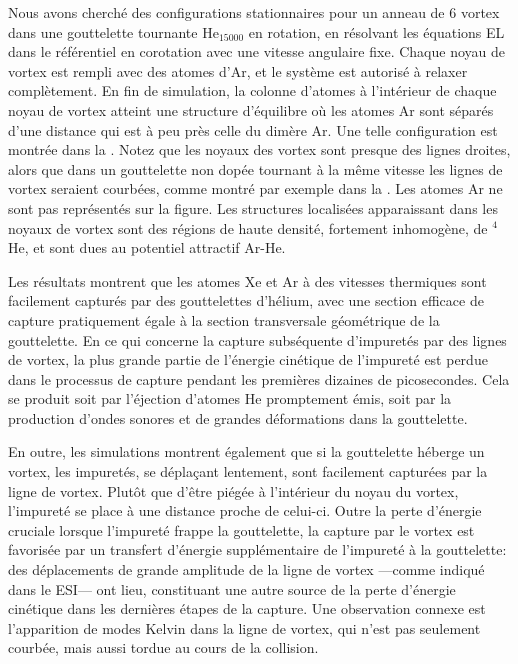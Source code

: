    Nous avons cherché des configurations stationnaires pour un anneau de 6 vortex dans une gouttelette tournante He$_{15000}$ en rotation,  en résolvant les équations EL dans le référentiel en  corotation avec une vitesse angulaire fixe. 
   Chaque noyau de vortex est rempli avec des atomes d'Ar, et le système est autorisé à relaxer complètement.
   En fin de simulation, la colonne d'atomes à l'intérieur de chaque noyau de vortex atteint une structure d'équilibre où les atomes Ar sont séparés d'une distance qui est à peu près celle du dimère Ar.
   Une telle configuration est montrée dans la . 
   Notez que les noyaux des vortex sont presque des lignes droites, alors que dans un gouttelette non dopée tournant à la même vitesse les lignes de vortex seraient courbées, comme montré par exemple dans la .
   Les atomes Ar ne sont pas représentés sur la figure.
   Les structures localisées apparaissant dans les noyaux de vortex sont des régions de haute densité, fortement inhomogène, de $^4$He, et sont dues au potentiel attractif Ar-He.

   Les résultats montrent que les atomes Xe et Ar à des vitesses thermiques sont facilement capturés par des gouttelettes d'hélium, avec une section efficace de capture pratiquement égale à la section transversale géométrique de la gouttelette. 
   En ce qui concerne la capture subséquente d'impuretés par des lignes de vortex, la plus grande partie de l'énergie cinétique de l'impureté est perdue dans le processus de capture pendant les premières dizaines de picosecondes. 
   Cela se produit soit par l'éjection d'atomes He promptement émis, soit par la production d'ondes sonores et de grandes déformations dans la gouttelette.

   En outre, les simulations montrent également que si la gouttelette héberge un vortex, les impuretés, se déplaçant lentement, sont facilement capturées par la ligne de vortex. 
   Plutôt que d'être piégée à l'intérieur du noyau du vortex, l'impureté se place à une distance proche de celui-ci. 
   Outre la perte d'énergie cruciale lorsque l'impureté frappe la gouttelette, la capture par le vortex est favorisée par un transfert d'énergie supplémentaire de l'impureté à la gouttelette: des déplacements de grande amplitude de la ligne de vortex ---comme indiqué dans le ESI\citep{ESI}--- ont lieu, constituant une autre source de la perte d'énergie cinétique dans les dernières étapes de la capture. 
   Une observation connexe est l'apparition de modes Kelvin dans la ligne de vortex, qui n'est pas seulement courbée, mais aussi tordue au cours de la collision.


